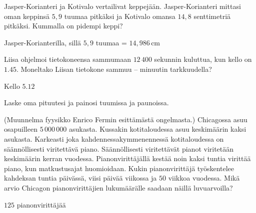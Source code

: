 \begin{tehtavasivu}
\begin{tehtava}
Jasper-Korianteri ja Kotivalo vertailivat keppejään. Jasper-Korianteri mittasi oman keppinsä $5,9$ tuumaa pitkäksi ja Kotivalo omansa $14,8$ senttimetriä pitkäksi. Kummalla on pidempi keppi?
	\begin{vastaus}
Jasper-Korianterilla, sillä $5,9$ tuumaa = $14,986$\,cm
	\end{vastaus}
\end{tehtava}

\begin{tehtava}
Liisa ohjelmoi tietokoneensa sammumaan $12\,400$ sekunnin kuluttua, kun kello on $1.45$. Moneltako Liisan tietokone sammuu -- minuutin tarkkuudella?
	\begin{vastaus}
Kello $5.12$
	\end{vastaus}
\end{tehtava}

\begin{tehtava}
Laske oma pituutesi ja painosi tuumissa ja paunoissa. %
\end{tehtava}

\begin{tehtava}
(Muunnelma fyysikko Enrico Fermin esittämästä ongelmasta.) Chicagossa asuu osapuilleen $5\,000\,000$ asukasta. Kussakin kotitaloudessa asuu keskimäärin kaksi asukasta. Karkeasti joka kahdennessakymmenennessä kotitaloudessa on säännöllisesti viritettävä piano. Säännöllisesti viritettävät pianot viritetään keskimäärin kerran vuodessa. Pianonvirittäjällä kestää noin kaksi tuntia virittää piano, kun matkustusajat huomioidaan. Kukin pianonvirittäjä työskentelee kahdeksan tuntia päivässä, viisi päivää viikossa ja $50$ viikkoa vuodessa. Mikä arvio Chicagon pianonvirittäjien lukumäärälle saadaan näillä luvuarvoilla?
	\begin{vastaus}
$125$ pianonvirittäjää
	\end{vastaus}
\end{tehtava}



\end{tehtavasivu}
